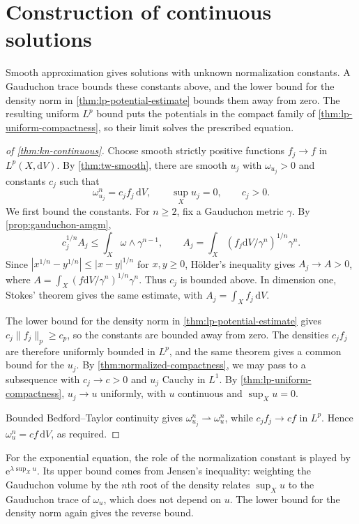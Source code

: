 \section{Construction of continuous solutions}

Smooth approximation gives solutions with unknown normalization constants. A Gauduchon trace bounds these constants above, and the lower bound for the density norm in \cref{thm:lp-potential-estimate} bounds them away from zero. The resulting uniform $L^p$ bound puts the potentials in the compact family of \cref{thm:lp-uniform-compactness}, so their limit solves the prescribed equation.

\begin{proof}[of \cref{thm:kn-continuous}]
Choose smooth strictly positive functions $f_j\to f$ in $L^p(X,\mathrm{d}V)$. By \cref{thm:tw-smooth}, there are smooth $u_j$ with $\omega_{u_j}>0$ and constants $c_j$ such that
\[
 \omega_{u_j}^n=c_jf_j\,\mathrm{d}V,\qquad \sup_Xu_j=0,\qquad c_j>0.
\]
We first bound the constants. For $n\geq2$, fix a Gauduchon metric $\gamma$. By \cref{prop:gauduchon-amgm},
\[
 c_j^{1/n}A_j\leq\int_X\omega\wedge\gamma^{n-1},
 \qquad A_j=\int_X(f_j\mathrm{d}V/\gamma^n)^{1/n}\gamma^n.
\]
Since $|x^{1/n}-y^{1/n}|\leq|x-y|^{1/n}$ for $x,y\geq0$, H\"older's inequality gives $A_j\to A>0$, where $A=\int_X(f\mathrm{d}V/\gamma^n)^{1/n}\gamma^n$. Thus $c_j$ is bounded above. In dimension one, Stokes' theorem gives the same estimate, with $A_j=\int_Xf_j\,\mathrm{d}V$.

The lower bound for the density norm in \cref{thm:lp-potential-estimate} gives
$c_j\|f_j\|_p\geq c_p$, so the constants are bounded away from zero. The densities $c_jf_j$ are therefore uniformly bounded in $L^p$, and the same theorem gives a common bound for the $u_j$. By \cref{thm:normalized-compactness}, we may pass to a subsequence with $c_j\to c>0$ and $u_j$ Cauchy in $L^1$. By \cref{thm:lp-uniform-compactness}, $u_j\to u$ uniformly, with $u$ continuous and $\sup_Xu=0$.

Bounded Bedford--Taylor continuity gives $\omega_{u_j}^n\rightharpoonup\omega_u^n$, while $c_jf_j\to cf$ in $L^p$. Hence $\omega_u^n=cf\,\mathrm{d}V$, as required.
\end{proof}

For the exponential equation, the role of the normalization constant is played by $\mathrm{e}^{\lambda\sup_Xu}$. Its upper bound comes from Jensen's inequality: weighting the Gauduchon volume by the $n$th root of the density relates $\sup_Xu$ to the Gauduchon trace of $\omega_u$, which does not depend on $u$. The lower bound for the density norm again gives the reverse bound.


